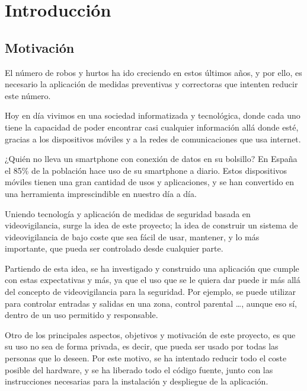 
\pagestyle{miEstilo1}

\section{Introducción}

\subsection{Motivación}

El número de robos y hurtos ha ido creciendo en estos últimos años, y por ello, es necesario la aplicación de medidas preventivas y correctoras que intenten reducir este número.

Hoy en día vivimos en una sociedad informatizada y tecnológica, donde cada uno tiene la capacidad de poder encontrar casi cualquier información allá donde esté, gracias a los dispositivos móviles y a la redes de comunicaciones que usa internet.

¿Quién no lleva un smartphone con conexión de datos en su bolsillo? En España el 85\% de la población hace uso de su smartphone a diario. Estos dispositivos móviles tienen una gran cantidad de usos y aplicaciones, y se han convertido en una herramienta imprescindible en nuestro día a día.

Uniendo tecnología y aplicación de medidas de seguridad basada en videovigilancia, surge la idea de este proyecto; la idea de construir un sistema de videovigilancia de bajo coste que sea fácil de usar, mantener, y lo más importante, que pueda ser controlado desde cualquier parte.

Partiendo de esta idea, se ha investigado y construido una aplicación que cumple con estas expectativas y más, ya que el uso que se le quiera dar puede ir más allá del concepto de videovigilancia para la seguridad. Por ejemplo, se puede utilizar para controlar entradas y salidas en una zona, control parental \ldots, aunque eso sí, dentro de un uso permitido y responsable.

Otro de los principales aspectos, objetivos y motivación de este proyecto, es que su uso no sea de forma privada, es decir, que pueda ser usado por todas las personas que lo deseen. Por este motivo, se ha intentado reducir todo el coste posible del hardware, y se ha liberado todo el código fuente, junto con las instrucciones necesarias para la instalación y despliegue de la aplicación.

